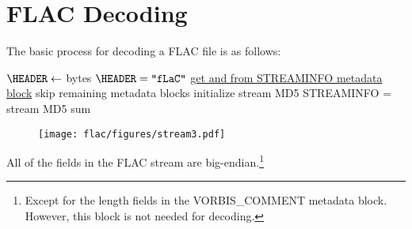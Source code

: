 
\section{FLAC Decoding}

The basic process for decoding a FLAC file is as follows:
\par
\noindent
{}
$\HEADER \leftarrow$  bytes\;
\ASSERT $\text{\HEADER} = \texttt{"fLaC"}$\;
\hyperref[flac:read_metadata]{get \PCMCOUNT and \MDSUM from STREAMINFO metadata block}\;
skip remaining metadata blocks\;
initialize stream MD5\;
\ASSERT STREAMINFO \MDSUM = stream MD5 sum
\EALGORITHM
\begin{figure}[h]
\texttt{[image: flac/figures/stream3.pdf]}
\end{figure}
\par
All of the fields in the FLAC stream are big-endian.\footnote{Except
for the length fields in the VORBIS\_COMMENT metadata block.
However, this block is not needed for decoding.
}

\clearpage

